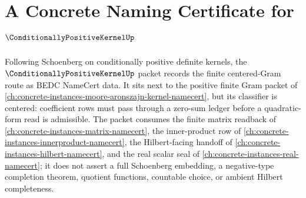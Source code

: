 \chapter{A Concrete Naming Certificate for $\ConditionallyPositiveKernelUp$}
\label{ch:concrete-instances-conditionally-positive-kernel-namecert}

Following Schoenberg on conditionally positive definite kernels, the $\ConditionallyPositiveKernelUp$ packet records the finite centered-Gram route as BEDC NameCert data. It sits next to the positive finite Gram packet of \autoref{ch:concrete-instances-moore-aronszajn-kernel-namecert}, but its classifier is centered: coefficient rows must pass through a zero-sum ledger before a quadratic-form read is admissible. The packet consumes the finite matrix readback of \autoref{ch:concrete-instances-matrix-namecert}, the inner-product row of \autoref{ch:concrete-instances-innerproduct-namecert}, the Hilbert-facing handoff of \autoref{ch:concrete-instances-hilbert-namecert}, and the real scalar seal of \autoref{ch:concrete-instances-real-namecert}; it does not assert a full Schoenberg embedding, a negative-type completion theorem, quotient functions, countable choice, or ambient Hilbert completeness.

